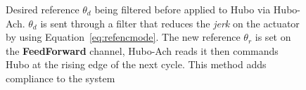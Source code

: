 \begin{figure}
\begin{tikzpicture}[->,>=stealth',shorten >=1pt,auto,node distance=5cm,
  thick,main node/.style={fill=white!20,draw,font=\sffamily\small\bfseries}]


\end{tikzpicture}
\caption{Desired reference $\theta_d$ being filtered before applied to Hubo via Hubo-Ach.  $\theta_d$ is sent through a filter that reduces the \textit{jerk} on the actuator by using Equation~\ref{eq:refencmode}.  The new reference $\theta_r$ is set on the \textbf{FeedForward} channel, Hubo-Ach reads it then commands Hubo at the rising edge of the next cycle.  This method adds compliance to the system}
\label{fig:hubo-ach-feedforwardFilterFeedBack}
\end{figure}

